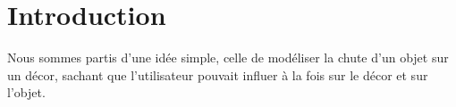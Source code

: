 \section{Introduction}
Nous sommes partis d'une idée simple, celle de modéliser la chute d'un objet sur un
décor, sachant que l'utilisateur pouvait influer à la fois sur le décor et sur l'objet.

